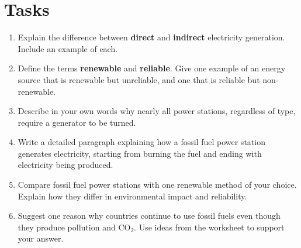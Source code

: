 \documentclass[12pt]{article}
\begin{document}
\section*{Tasks}

\begin{enumerate}
    \item Explain the difference between \textbf{direct} and \textbf{indirect} electricity generation. Include an example of each.
    
    \item Define the terms \textbf{renewable} and \textbf{reliable}. Give one example of an energy source that is renewable but unreliable, and one that is reliable but non-renewable.
    
    \item Describe in your own words why nearly all power stations, regardless of type, require a generator to be turned.
    
    \item Write a detailed paragraph explaining how a fossil fuel power station generates electricity, starting from burning the fuel and ending with electricity being produced.
    
    \item Compare fossil fuel power stations with one renewable method of your choice. Explain how they differ in environmental impact and reliability.
    
    \item Suggest one reason why countries continue to use fossil fuels even though they produce pollution and CO$_2$. Use ideas from the worksheet to support your answer.
\end{enumerate}
\end{document}
